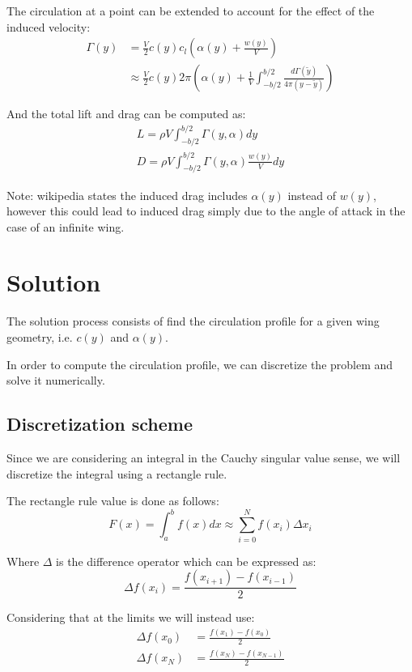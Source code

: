 The circulation at a point can be extended to account for the effect of the induced velocity:
\begin{align}
    \Gamma(y)   &= \frac{V}{2} c(y)  c_l\left( \alpha(y) + \frac{w(y)}{V}\right) \\
                &\approx \frac{V}{2} c(y) 2 \pi\left(\alpha(y) + \frac{1}{V} \int_{-b/2}^{b/2} \frac{d\Gamma(\tilde{y})}{4\pi\left(y - \tilde{y}\right)} \right)
\end{align}

And the total lift and drag can be computed as:
\begin{align}
    L = \rho V  \int_{-b/2}^{b/2} \Gamma(y, \alpha) dy \\
    D = \rho V \int_{-b/2}^{b/2} \Gamma(y, \alpha) \frac{w(y)}{V} dy
\end{align}

Note: wikipedia states the induced drag includes $\alpha(y)$ instead of $w(y)$, however this could lead to induced drag simply due to the angle of attack in the case of an infinite wing.

\section{Solution}
The solution process consists of find the circulation profile for a given wing geometry, i.e. $c(y)$ and $\alpha(y)$.

In order to compute the circulation profile, we can discretize the problem and solve it numerically.

\subsection{Discretization scheme}
Since we are considering an integral in the Cauchy singular value sense, we will discretize the integral using a rectangle rule.

The rectangle rule value is done as follows:
\begin{equation}
    F(x) = \int_{a}^{b} f(x) dx \approx \sum_{i=0}^{N} f(x_i) \Delta x_i
\end{equation}

Where $\Delta$ is the difference operator which can be expressed as:
\begin{equation}
    \Delta f(x_i) = \frac{f(x_{i+1}) - f(x_{i-1})}{2}
\end{equation}

Considering that at the limits we will instead use:
\begin{align}
    \Delta f(x_0) &= \frac{f(x_1) - f(x_0)}{2} \\
    \Delta f(x_N) &= \frac{f(x_N) - f(x_{N-1})}{2}
\end{align}

